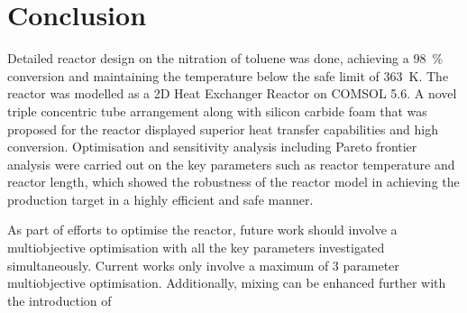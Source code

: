 \section{Conclusion} \label{sec:conclusion}
Detailed reactor design on the nitration of toluene was done, achieving a \SI{98}{\%} conversion and maintaining the temperature below the safe limit of \SI{363}{\K}. The reactor was modelled as a 2D Heat Exchanger Reactor on COMSOL 5.6. A novel triple concentric tube arrangement along with silicon carbide foam that was proposed for the reactor displayed superior heat transfer capabilities and high conversion. Optimisation and sensitivity analysis including Pareto frontier analysis were carried out on the key parameters such as reactor temperature and reactor length, which showed the robustness of the reactor model in achieving the production target in a highly efficient and safe manner. 

As part of efforts to optimise the reactor, future work should involve a multiobjective optimisation with all the key parameters investigated simultaneously. Current works only involve a maximum of 3 parameter multiobjective optimisation. Additionally, mixing can be enhanced further with the introduction of 


